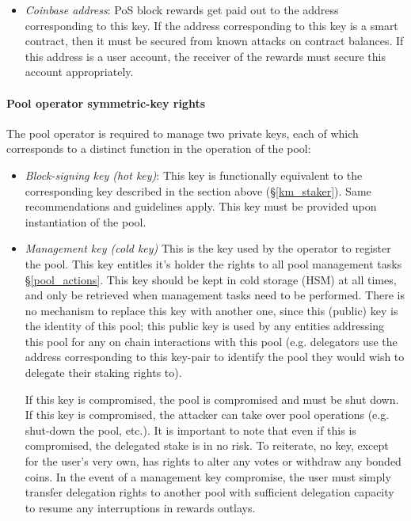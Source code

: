 \begin{itemize}
    \item \textit{Coinbase address}: PoS block rewards get paid out to the address corresponding to this key. If the address corresponding to this key is a smart contract, then it must be secured from known attacks on contract balances. If this address is a user account, the receiver of the rewards must secure this account appropriately.
\end{itemize}


\paragraph{Pool operator symmetric-key rights} The pool operator is required to manage two private keys, each of which corresponds to a distinct function in the operation of the pool: 
\begin{itemize}
   
    \item \textit{Block-signing key (hot key)}: This key is functionally equivalent to the corresponding key described in the section above (\S\ref{km_staker}). Same recommendations and guidelines apply. This key must be provided upon instantiation of the pool. 
    
    \item \textit{Management key (cold key)}  This is the key used by the operator to register the pool. This key entitles it's holder the rights to all pool management tasks \S\ref{pool_actions}. This key should be kept in cold storage (HSM) at all times, and only be retrieved when management tasks need to be performed. There is no mechanism to replace this key with another one, since this (public) key is the identity of this pool; this public key is used by any entities addressing this pool for any on chain interactions with this pool (e.g. delegators use the address corresponding to this key-pair to identify the pool they would wish to delegate their staking rights to). 
    
    If this key is compromised, the pool is compromised and must be shut down. If this key is compromised, the attacker can take over pool operations (e.g. shut-down the pool, etc.). It is important to note that even if this  is compromised, the delegated stake is in no risk. To reiterate, no key, except for the user's very own, has rights to alter any votes or withdraw any bonded coins. In the event of a management key compromise, the user must simply transfer delegation rights to another pool with sufficient delegation capacity to resume any interruptions in rewards outlays. 
\end{itemize}

